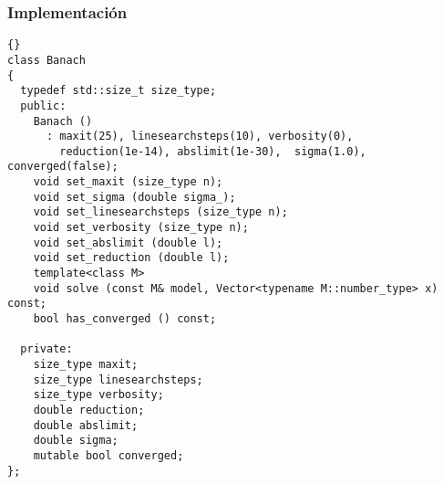 \subsubsection{Implementación}
{\footnotesize{\begin{lstlisting}{}
class Banach
{
  typedef std::size_t size_type;
  public:
    Banach ()
      : maxit(25), linesearchsteps(10), verbosity(0),
        reduction(1e-14), abslimit(1e-30),  sigma(1.0), converged(false);
    void set_maxit (size_type n);
    void set_sigma (double sigma_);
    void set_linesearchsteps (size_type n);
    void set_verbosity (size_type n);
    void set_abslimit (double l);
    void set_reduction (double l);
    template<class M>
    void solve (const M& model, Vector<typename M::number_type> x) const;
    bool has_converged () const;

  private:
    size_type maxit;
    size_type linesearchsteps;
    size_type verbosity;
    double reduction;
    double abslimit;
    double sigma;
    mutable bool converged;
};
\end{lstlisting}}}

